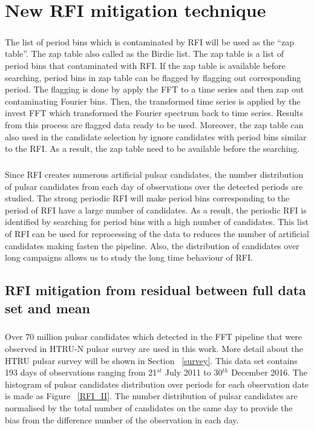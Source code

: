 \documentclass[thesis_msc.tex]{subfiles}
\begin{document}
\chapter{New RFI mitigation technique} \label{RFI}

     \paragraph{} The list of period bins which is contaminated by RFI will be used as the ``zap table''. The zap table also called as the Birdie list. The zap table is a list of period bins that contaminated with RFI. If the zap table is available before searching, period bins in zap table can be flagged by flagging out corresponding period. The flagging is done by apply the FFT to a time series and then zap out contaminating Fourier bins. Then, the transformed time series is applied by the invest FFT which transformed the Fourier spectrum back to time series. Results from this process are flagged data ready to be used. Moreover, the zap table can also used in the candidate selection by ignore candidates with period bins similar to the RFI. As a result, the zap table need to be available before the searching. %
     
     \paragraph{} Since RFI creates numerous artificial pulsar candidates, the number distribution of pulsar candidates from each day of observations over the detected periods are studied. The strong periodic RFI will make period bins corresponding to the period of RFI have a large number of candidates. As a result, the periodic RFI is identified by searching for period bins with a high number of candidates. This list of RFI can be used for reprocessing of the data to reduces the number of artificial candidates making fasten the pipeline. Also, the distribution of candidates over long campaigns allows us to study the long time behaviour of RFI. 

     \section{RFI mitigation from residual between full data set and mean}
     
    \paragraph{} Over 70 million pulsar candidates which detected in the FFT pipeline that were observed in HTRU-N pulsar survey are used in this work. More detail about the HTRU pulsar survey will be shown in Section ~\ref{survey}.  This data set contains 193 days of observations ranging from 21$^{st}$ July 2011 to 30$^{th}$ December 2016. The histogram of pulsar candidates distribution over periods for each observation date is made as Figure ~\ref{RFI_II}. The number distribution of pulsar candidates are normalised by the total number of candidates on the same day to provide the bias from the difference number of the observation in each day.
\end{document}

